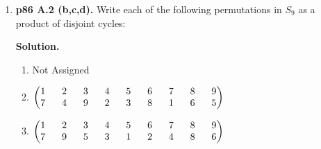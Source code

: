 \documentclass[11pt]{article}
\begin{document}
\begin{enumerate}
\begin{enumerate}
  \end{enumerate}

\item {\bfseries p86 A.2 (b,c,d).} Write each of the following permutations in $S_9$ as a product of disjoint cycles:
  
	{\bfseries Solution.}
	
	\begin{enumerate}
	
		\item Not Assigned
	
		\item 
		$\begin{pmatrix}
			1 \hspace{6mm} 2 \hspace{6mm} 3 \hspace{6mm} 4 \hspace{6mm} 5 \hspace{6mm} 6 \hspace{6mm} 7 \hspace{6mm} 8 \hspace{6mm} 9 \\
			7 \hspace{6mm} 4 \hspace{6mm} 9 \hspace{6mm} 2 \hspace{6mm} 3 \hspace{6mm} 8 \hspace{6mm} 1 \hspace{6mm} 6 \hspace{6mm} 5
		\end{pmatrix}$
		
		\item 
		$\begin{pmatrix}
			1 \hspace{6mm} 2 \hspace{6mm} 3 \hspace{6mm} 4 \hspace{6mm} 5 \hspace{6mm} 6 \hspace{6mm} 7 \hspace{6mm} 8 \hspace{6mm} 9 \\
			7 \hspace{6mm} 9 \hspace{6mm} 5 \hspace{6mm} 3 \hspace{6mm} 1 \hspace{6mm} 2 \hspace{6mm} 4 \hspace{6mm} 8 \hspace{6mm} 6
		\end{pmatrix}$
		

\end{enumerate}
\end{enumerate}
\end{document}

